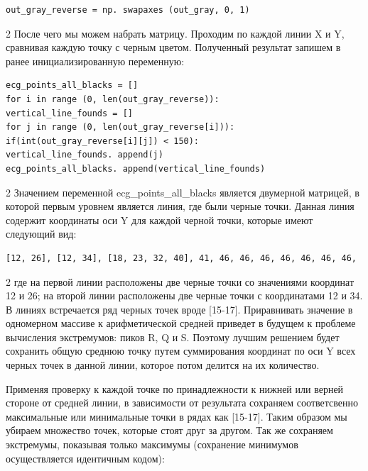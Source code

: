 {\small
\begin{verbatim}
out_gray_reverse = np. swapaxes (out_gray, 0, 1)
\end{verbatim}
}

\begin{multicols}{2}
После чего мы можем набрать матрицу. Проходим по каждой линии X и Y,
сравнивая каждую точку с черным цветом. Полученный результат запишем в
ранее инициализированную переменную:
\end{multicols}

{\small
\begin{verbatim}
ecg_points_all_blacks = []
for i in range (0, len(out_gray_reverse)):
vertical_line_founds = []
for j in range (0, len(out_gray_reverse[i])):
if(int(out_gray_reverse[i][j]) < 150):
vertical_line_founds. append(j)
ecg_points_all_blacks. append(vertical_line_founds)
\end{verbatim}
}

\begin{multicols}{2}
Значением переменной ecg\_points\_all\_blacks является двумерной
матрицей, в которой первым уровнем является линия, где были черные
точки. Данная линия содержит координаты оси Y для каждой черной точки,
которые имеют следующий вид:
\end{multicols}

{\small
\begin{verbatim}
[12, 26], [12, 34], [18, 23, 32, 40], 41, 46, 46, 46, 46, 46, 46, 46,
\end{verbatim}
}

\begin{multicols}{2}
где на первой линии расположены две черные точки со значениями координат
12 и 26; на второй линии расположены две черные точки с координатами 12
и 34. В линиях встречается ряд черных точек вроде {[}15-17{]}.
Приравнивать значение в одномерном массиве к арифметической средней
приведет в будущем к проблеме вычисления экстремумов: пиков R, Q и S.
Поэтому лучшим решением будет сохранить общую среднюю точку путем
суммирования координат по оси Y всех черных точек в данной линии,
которое потом делится на их количество.

Применяя проверку к каждой точке по принадлежности к нижней или верней
стороне от средней линии, в зависимости от результата сохраняем
соответсвенно максимальные или минимальные точки в рядах как
{[}15-17{]}. Таким образом мы убираем множество точек, которые стоят
друг за другом. Так же сохраняем экстремумы, показывая только максимумы
(сохранение минимумов осуществляется идентичным кодом):
\end{multicols}

